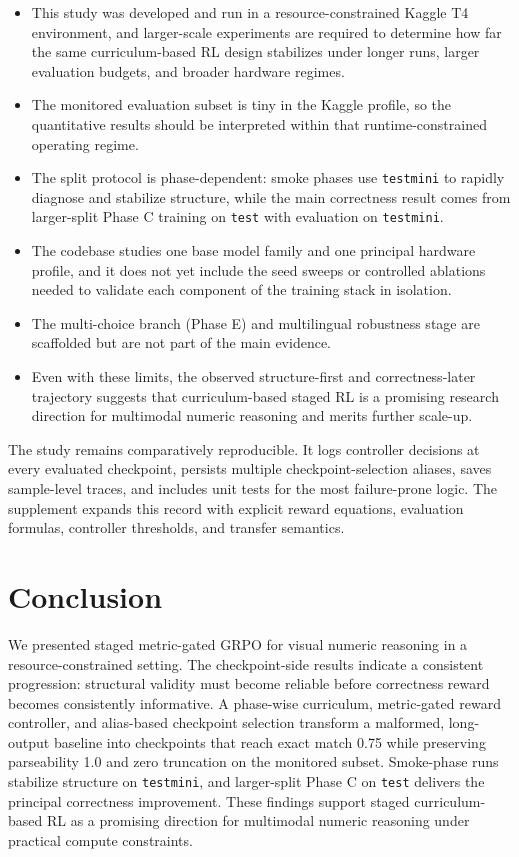 \documentclass{article} %
\begin{document}
\begin{itemize}[leftmargin=1.2em]
\item This study was developed and run in a resource-constrained Kaggle T4 environment, and larger-scale experiments are required to determine how far the same curriculum-based RL design stabilizes under longer runs, larger evaluation budgets, and broader hardware regimes.
\item The monitored evaluation subset is tiny in the Kaggle profile, so the quantitative results should be interpreted within that runtime-constrained operating regime.
\item The split protocol is phase-dependent: smoke phases use \texttt{testmini} to rapidly diagnose and stabilize structure, while the main correctness result comes from larger-split Phase C training on \texttt{test} with evaluation on \texttt{testmini}.
\item The codebase studies one base model family and one principal hardware profile, and it does not yet include the seed sweeps or controlled ablations needed to validate each component of the training stack in isolation.
\item The multi-choice branch (Phase E) and multilingual robustness stage are scaffolded but are not part of the main evidence.
\item Even with these limits, the observed structure-first and correctness-later trajectory suggests that curriculum-based staged RL is a promising research direction for multimodal numeric reasoning and merits further scale-up.
\end{itemize}

The study remains comparatively reproducible. It logs controller decisions at every evaluated checkpoint, persists multiple checkpoint-selection aliases, saves sample-level traces, and includes unit tests for the most failure-prone logic. The supplement expands this record with explicit reward equations, evaluation formulas, controller thresholds, and transfer semantics.

\section{Conclusion}

We presented staged metric-gated GRPO for visual numeric reasoning in a resource-constrained setting. The checkpoint-side results indicate a consistent progression: structural validity must become reliable before correctness reward becomes consistently informative. A phase-wise curriculum, metric-gated reward controller, and alias-based checkpoint selection transform a malformed, long-output baseline into checkpoints that reach exact match 0.75 while preserving parseability 1.0 and zero truncation on the monitored subset. Smoke-phase runs stabilize structure on \texttt{testmini}, and larger-split Phase C on \texttt{test} delivers the principal correctness improvement. These findings support staged curriculum-based RL as a promising direction for multimodal numeric reasoning under practical compute constraints.



\end{document}
